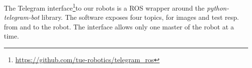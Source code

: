 \label{ssec:telegram}
The Telegram interface\footnote{\url{https://github.com/tue-robotics/telegram_ros}}to our robots is a ROS wrapper around the \emph{python-telegram-bot} library. The software exposes four topics, for images and test resp. from and to the robot. 
The interface allows only one master of the robot at a time.

